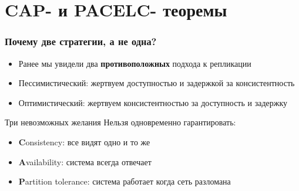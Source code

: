 \documentclass{beamer}
\begin{document}




\section{CAP- и PACELC- теоремы}

\begin{frame}
\frametitle{Почему две стратегии, а не одна?}

\begin{itemize}
  \item Ранее мы увидели два \textbf{противоположных} подхода к репликации
  \item Пессимистический: жертвуем доступностью и задержкой за консистентность
  \item Оптимистический: жертвуем консистентностью за доступность и задержку
\end{itemize}

\begin{block}{Три невозможных желания}
Нельзя одновременно гарантировать:
\begin{itemize}
  \item \textbf{C}onsistency: все видят одно и то же
  \item \textbf{A}vailability: система всегда отвечает
  \item \textbf{P}artition tolerance: система работает когда сеть разломана
\end{itemize}
\end{block}

\end{frame}
\end{document}
